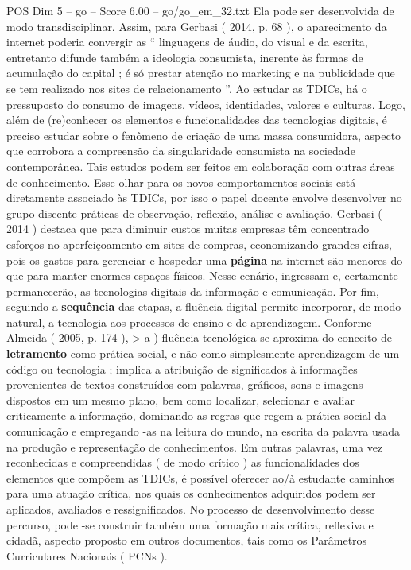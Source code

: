 \begin{textsample}{POS Dim 5 – go – Score 6.00 – go/go\_em\_32.txt}
Ela pode ser desenvolvida de modo transdisciplinar.
Assim, para Gerbasi ( 2014, p. 68 ), o aparecimento da internet poderia convergir as “ linguagens de áudio, do visual e da escrita, entretanto difunde também a ideologia consumista, inerente às formas de acumulação do capital ; é só prestar atenção no marketing e na publicidade que se tem realizado nos sites de relacionamento ”.
Ao estudar as TDICs, há o pressuposto do consumo de imagens, vídeos, identidades, valores e culturas.
Logo, além de (re)conhecer os elementos e funcionalidades das tecnologias digitais, é preciso estudar sobre o fenômeno de criação de uma massa consumidora, aspecto que corrobora a compreensão da singularidade consumista na sociedade contemporânea.
Tais estudos podem ser feitos em colaboração com outras áreas de conhecimento.
Esse olhar para os novos comportamentos sociais está diretamente associado às TDICs, por isso o papel docente envolve desenvolver no grupo discente práticas de observação, reflexão, análise e avaliação.
Gerbasi ( 2014 ) destaca que para diminuir custos muitas empresas têm concentrado esforços no aperfeiçoamento em sites de compras, economizando grandes cifras, pois os gastos para gerenciar e hospedar uma \textbf{página} na internet são menores do que para manter enormes espaços físicos.
Nesse cenário, ingressam e, certamente permanecerão, as tecnologias digitais da informação e comunicação.
Por fim, seguindo a \textbf{sequência} das etapas, a fluência digital permite incorporar, de modo natural, a tecnologia aos processos de ensino e de aprendizagem.
Conforme Almeida ( 2005, p. 174 ), > a ) fluência tecnológica se aproxima do conceito de \textbf{letramento} como prática social, e não como simplesmente aprendizagem de um código ou tecnologia ; implica a atribuição de significados à informações provenientes de textos construídos com palavras, gráficos, sons e imagens dispostos em um mesmo plano, bem como localizar, selecionar e avaliar criticamente a informação, dominando as regras que regem a prática social da comunicação e empregando -as na leitura do mundo, na escrita da palavra usada na produção e representação de conhecimentos.
Em outras palavras, uma vez reconhecidas e compreendidas ( de modo crítico ) as funcionalidades dos elementos que compõem as TDICs, é possível oferecer ao/à estudante caminhos para uma atuação crítica, nos quais os conhecimentos adquiridos podem ser aplicados, avaliados e ressignificados.
No processo de desenvolvimento desse percurso, pode -se construir também uma formação mais crítica, reflexiva e cidadã, aspecto proposto em outros documentos, tais como os Parâmetros Curriculares Nacionais ( PCNs ).

\end{textsample}
